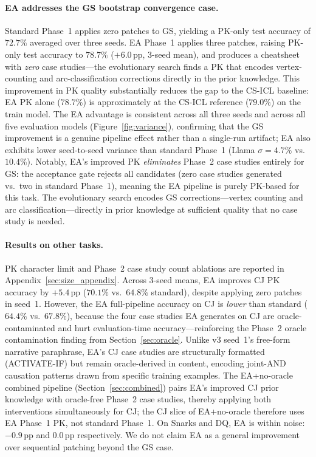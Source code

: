 \documentclass{article}
\begin{document}
\paragraph{EA addresses the GS bootstrap convergence case.}
Standard Phase~1 applies zero patches to GS, yielding a PK-only test accuracy of $72.7\%$
averaged over three seeds.
EA Phase~1 applies three patches, raising PK-only test accuracy to $78.7\%$ ($+6.0$\,pp,
3-seed mean), and produces a cheatsheet with \emph{zero} case studies---the evolutionary
search finds a PK that encodes vertex-counting and arc-classification corrections directly in
the prior knowledge.
This improvement in PK quality substantially reduces the gap to the CS-ICL baseline:
EA PK alone ($78.7\%$) is approximately at the CS-ICL reference ($79.0\%$) on the train model.
The EA advantage is consistent across all three seeds and across all five evaluation models
(Figure~\ref{fig:variance}), confirming that the GS improvement is a genuine pipeline effect
rather than a single-run artifact; EA also exhibits lower seed-to-seed variance than
standard Phase~1 (Llama $\sigma=4.7\%$ vs.\ $10.4\%$).
Notably, EA's improved PK \emph{eliminates} Phase~2 case studies entirely for GS: the
acceptance gate rejects all candidates (zero case studies generated vs.\ two in standard Phase~1),
meaning the EA pipeline is purely PK-based for this task.
The evolutionary search encodes GS corrections---vertex counting and arc classification---directly
in prior knowledge at sufficient quality that no case study is needed.

\paragraph{Results on other tasks.}
PK character limit and Phase~2 case study count ablations are reported in
Appendix~\ref{sec:size_appendix}.
Across 3-seed means, EA improves CJ PK accuracy by $+5.4$\,pp ($70.1\%$ vs.\ $64.8\%$
standard), despite applying zero patches in seed~1.
However, the EA full-pipeline accuracy on CJ is \emph{lower} than standard
($64.4\%$ vs.\ $67.8\%$), because the four case studies EA generates on CJ
are oracle-contaminated and hurt evaluation-time accuracy---reinforcing the Phase~2
oracle contamination finding from Section~\ref{sec:oracle}.
Unlike v3 seed~1's free-form narrative paraphrase, EA's CJ case studies are structurally
formatted (ACTIVATE-IF) but remain oracle-derived in content, encoding joint-AND
causation patterns drawn from specific training examples.
The EA+no-oracle combined pipeline (Section~\ref{sec:combined}) pairs EA's improved CJ prior
knowledge with oracle-free Phase~2 case studies, thereby applying both interventions
simultaneously for CJ; the CJ slice of EA+no-oracle therefore uses EA Phase~1 PK, not standard Phase~1.
On Snarks and DQ, EA is within noise: $-0.9$\,pp and $0.0$\,pp respectively.
We do not claim EA as a general improvement over sequential patching beyond the GS case.
\end{document}
